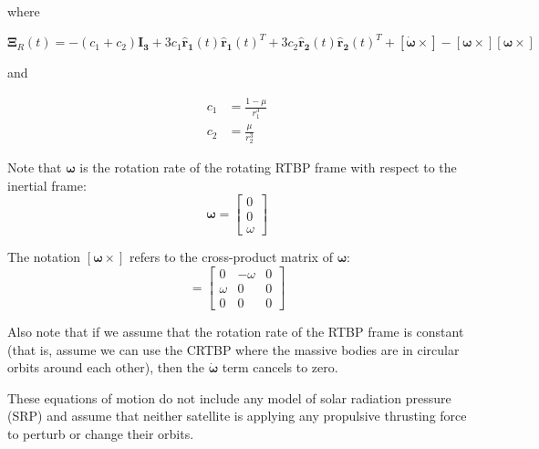 \documentclass[a4paper]{article}
\begin{document}
where

\begin{equation*}
\mathbf{\Xi}_R(t) = -(c_1 + c_2)\mathbf{I_3} 
								+ 3c_1\mathbf{\hat{r}_1}(t) \mathbf{\hat{r}_1}(t)^T 
								+ 3c_2\mathbf{\hat{r}_2}(t) \mathbf{\hat{r}_2}(t)^T 
								+ [\boldsymbol{\dot{\omega}} \times] 
								- [\boldsymbol{\omega}\times][\boldsymbol{\omega}\times]
\end{equation*}

and

\begin{equation*}
\begin{aligned}
c_1 &= \frac{1- \mu}{r_1^3} \\
c_2 &= \frac{\mu}{r_2^3}
\end{aligned}
\end{equation*}

Note that \(\boldsymbol{\omega}\) is the rotation rate of the rotating RTBP frame with respect to the inertial frame:
\begin{equation*}
\boldsymbol{\omega} = \begin{bmatrix}
					0 \\ 
					0 \\
					\omega
					\end{bmatrix}
\end{equation*}

The notation  \([\boldsymbol{\omega}\times]\) refers to the cross-product matrix of \(\boldsymbol{\omega}\):
\begin{equation*}
[\boldsymbol{\omega}\times] = \begin{bmatrix}
								0           & -\omega & 0 \\ 
								\omega & 0             & 0 \\
								0           & 0             & 0
								\end{bmatrix}
\end{equation*}

Also note that if we assume that the rotation rate of the RTBP frame is constant (that is, assume we can use the CRTBP where the massive bodies are in circular orbits around each other), then the \(\boldsymbol{\dot{\omega}}\) term cancels to zero.

These equations of motion do not include any model of solar radiation pressure (SRP) and assume that neither satellite is applying any propulsive thrusting force to perturb or change their orbits. 
\end{document}
